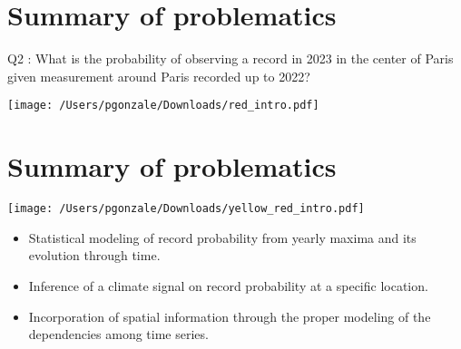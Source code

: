 \documentclass[9pt,compress]{beamer}
\begin{document}
\section{Summary of problematics} 
\begin{frame}{Q2 : What is the probability of observing a record in 2023 in the center of Paris given measurement around Paris recorded up to 2022?}
\begin{center}
\texttt{[image: /Users/pgonzale/Downloads/red\_intro.pdf]}
 \end{center}    
  \pause
\end{frame}
%
%
%
\section{Summary of problematics} 
\begin{frame} 
\begin{center}
\texttt{[image: /Users/pgonzale/Downloads/yellow\_red\_intro.pdf]}
\end{center}
\end{frame}
%
%
%
\begin{frame}%
\begin{tcolorbox}[title= Limitations that we need to address]
\begin{itemize}
	\item Statistical modeling of record probability from yearly maxima and its evolution through time. 
	\item Inference of a climate signal on record probability at a specific location.
	\item Incorporation of spatial information through the proper modeling of the dependencies among time series.
\end{itemize}
\end{tcolorbox}
\end{frame}
%
%
%
\end{document}
